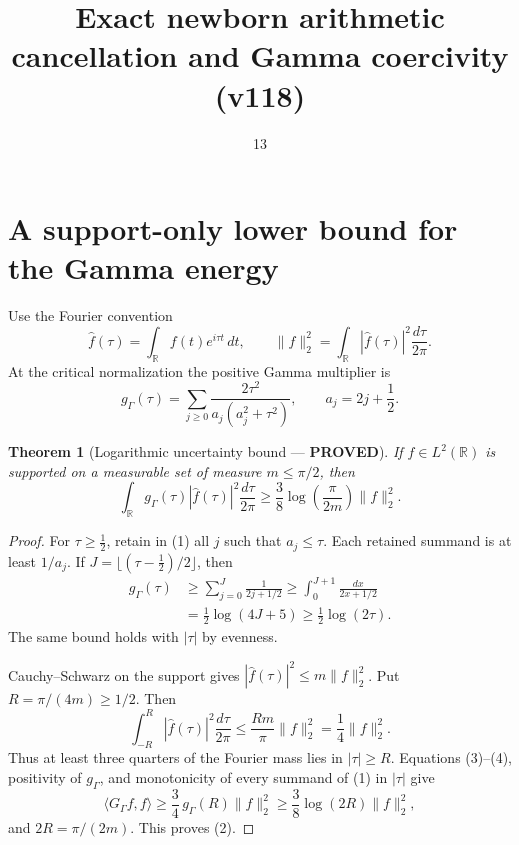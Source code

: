 \documentclass[11pt]{article}
\title{Exact newborn arithmetic cancellation and Gamma coercivity (v118)}
\date{13}
\newcommand{\PROVED}{\textcolor{green!40!black}{\textbf{PROVED}}}
\newtheorem{theorem}{Theorem}
\begin{document}
\maketitle

\section{A support-only lower bound for the Gamma energy}

Use the Fourier convention
\[
 \widehat f(\tau)=\int_{\mathbb R}f(t)e^{i\tau t}\,dt,
 \qquad
 \|f\|_2^2=\int_{\mathbb R}|\widehat f(\tau)|^2\frac{d\tau}{2\pi}.
\]
At the critical normalization the positive Gamma multiplier is
\begin{equation}
 g_\Gamma(\tau)=\sum_{j\ge0}
 \frac{2\tau^2}{a_j(a_j^2+\tau^2)},
 \qquad a_j=2j+\frac12.                                     \tag{1}
\end{equation}

\begin{theorem}[Logarithmic uncertainty bound --- \PROVED]
If $f\in L^2(\mathbb R)$ is supported on a measurable set of measure
$m\le\pi/2$, then
\begin{equation}
 \boxed{
 \int_{\mathbb R}g_\Gamma(\tau)|\widehat f(\tau)|^2
                 \frac{d\tau}{2\pi}
 \ge \frac38\log\!\left(\frac{\pi}{2m}\right)\|f\|_2^2.} \tag{2}
\end{equation}
\end{theorem}

\begin{proof}
For $\tau\ge\tfrac12$, retain in (1) all $j$ such that $a_j\le\tau$.
Each retained summand is at least $1/a_j$.  If
$J=\lfloor(\tau-\frac12)/2\rfloor$, then
\begin{align*}
 g_\Gamma(\tau)
 &\ge\sum_{j=0}^J\frac1{2j+1/2}
 \ge\int_0^{J+1}\frac{dx}{2x+1/2}\\
 &=\frac12\log(4J+5)
 \ge\frac12\log(2\tau).                                   \tag{3}
\end{align*}
The same bound holds with $|\tau|$ by evenness.

Cauchy--Schwarz on the support gives
$|\widehat f(\tau)|^2\le m\|f\|_2^2$.  Put
$R=\pi/(4m)\ge1/2$.  Then
\begin{equation}
 \int_{-R}^R|\widehat f(\tau)|^2\frac{d\tau}{2\pi}
 \le\frac{Rm}{\pi}\|f\|_2^2
 =\frac14\|f\|_2^2.                                       \tag{4}
\end{equation}
Thus at least three quarters of the Fourier mass lies in $|\tau|\ge R$.
Equations (3)--(4), positivity of $g_\Gamma$, and monotonicity of every
summand of (1) in $|\tau|$ give
\[
 \langle G_\Gamma f,f\rangle
 \ge\frac34\,g_\Gamma(R)\|f\|_2^2
 \ge\frac38\log(2R)\|f\|_2^2,
\]
and $2R=\pi/(2m)$.  This proves (2).
\end{proof}
\end{document}
